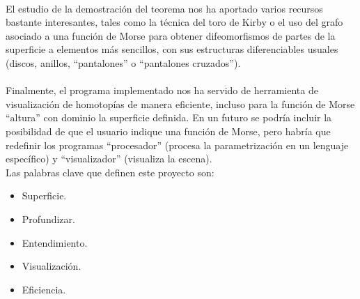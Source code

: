 \\El estudio de la demostración del teorema nos ha aportado varios recursos bastante interesantes, tales como la técnica del toro de Kirby o el uso del grafo asociado a una función de Morse para obtener difeomorfismos de partes de la superficie a elementos más sencillos, con sus estructuras diferenciables usuales (discos, anillos, ``pantalones'' o ``pantalones cruzados'').\\
\\Finalmente, el programa implementado nos ha servido de herramienta de visualización de homotopías de manera eficiente, incluso para la función de Morse ``altura'' con dominio la superficie definida. En un futuro se podría incluir la posibilidad de que el usuario indique una función de Morse, pero habría que redefinir los programas ``procesador'' (procesa la parametrización en un lenguaje específico) y ``visualizador'' (visualiza la escena).\\

\newpage
Las palabras clave que definen este proyecto son:
\begin{itemize}
	\item Superficie.
	\item Profundizar.
	\item Entendimiento.
	\item Visualización.
	\item Eficiencia.
\end{itemize}

\endinput
